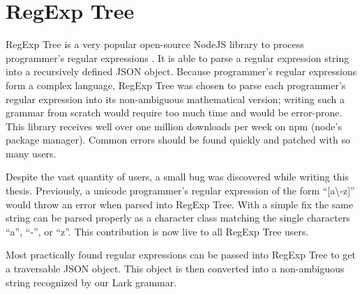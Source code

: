 \section{RegExp Tree}
\label{sec:RegExp Tree}
RegExp Tree is a very popular open-source NodeJS library to process programmer's regular expressions \cite{regexp-tree}. It is able to parse a regular expression string into a recursively defined JSON object. Because programmer's regular expressions form a complex language, RegExp Tree was chosen to parse each programmer's regular expression into its non-ambiguous mathematical version; writing such a grammar from scratch would require too much time and would be error-prone. This library receives well over one million downloads per week on npm (node's package manager). Common errors should be found quickly and patched with so many users.

Despite the vast quantity of users, a small bug was discovered while writing this thesis. Previously, a unicode programmer's regular expression of the form ``[a\textbackslash-z]'' would throw an error when parsed into RegExp Tree. With a simple fix the same string can be parsed properly as a character class matching the single characters ``a'', ``-'', or ``z''. This contribution is now live to all RegExp Tree users.

Most practically found regular expressions can be passed into RegExp Tree to get a traversable JSON object. This object is then converted into a non-ambiguous string recognized by our Lark grammar.














